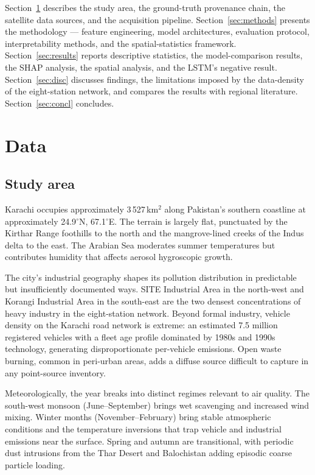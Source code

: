 \documentclass{iopjournal}
\begin{document}
Section~\ref{sec:data} describes the study area, the ground-truth
provenance chain, the satellite data sources, and the acquisition
pipeline. Section~\ref{sec:methods} presents the methodology --- feature
engineering, model architectures, evaluation protocol, interpretability
methods, and the spatial-statistics framework. Section~\ref{sec:results}
reports descriptive statistics, the model-comparison results, the
SHAP analysis, the spatial analysis, and the LSTM's negative
result. Section~\ref{sec:disc} discusses findings, the limitations
imposed by the data-density of the eight-station network, and
compares the results with regional literature.
Section~\ref{sec:concl} concludes.

\section{Data}
\label{sec:data}

\subsection{Study area}

Karachi occupies approximately 3\,527\,km$^{2}$ along Pakistan's
southern coastline at approximately 24.9$^{\circ}$N,
67.1$^{\circ}$E. The terrain is largely flat, punctuated by the
Kirthar Range foothills to the north and the mangrove-lined creeks of
the Indus delta to the east. The Arabian Sea moderates summer
temperatures but contributes humidity that affects aerosol
hygroscopic growth.

The city's industrial geography shapes its pollution distribution in
predictable but insufficiently documented ways. SITE Industrial Area
in the north-west and Korangi Industrial Area in the south-east are
the two densest concentrations of heavy industry in the eight-station
network. Beyond formal industry, vehicle density on the Karachi road
network is extreme: an estimated 7.5 million registered vehicles with
a fleet age profile dominated by 1980s and 1990s technology, generating
disproportionate per-vehicle emissions. Open waste burning, common in
peri-urban areas, adds a diffuse source difficult to capture in any
point-source inventory.

Meteorologically, the year breaks into distinct regimes relevant to
air quality. The south-west monsoon (June--September) brings wet
scavenging and increased wind mixing. Winter months
(November--February) bring stable atmospheric conditions and the
temperature inversions that trap vehicle and industrial emissions near
the surface. Spring and autumn are transitional, with periodic dust
intrusions from the Thar Desert and Balochistan adding episodic coarse
particle loading.
\end{document}
